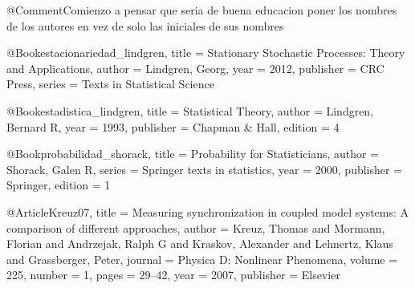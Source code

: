 @Comment{Comienzo a pensar que seria de buena educacion poner los nombres de los autores en vez
         de solo las iniciales de sus nombres}
%
%
%
%
%

%


@Book{estacionariedad_lindgren,
    title     = {{Stationary Stochastic Processes: Theory and Applications}},
    author    = {Lindgren, Georg},
    year      = {2012},
    publisher = {CRC Press},
    series    = {{Texts in Statistical Science}}
}

@Book{estadistica_lindgren,
    title     = {Statistical Theory},
    author    = {Lindgren, Bernard R},
    year      = {1993},
    publisher = {Chapman \& Hall},
    edition   = {4}
}

@Book{probabilidad_shorack,
    title     = {{Probability for Statisticians}},
    author    = {Shorack, Galen R},
    series    = {Springer texts in statistics},
    year      = {2000},
    publisher = {Springer},
    edition   = {1}
}

@Article{Kreuz07,
    title   = {Measuring synchronization in coupled model systems: {A} comparison of different 
    		   approaches},
    author  = {Kreuz, Thomas 
    		   and Mormann, Florian 
    		   and Andrzejak, Ralph G 
    		   and Kraskov, Alexander 
    		   and Lehnertz, Klaus 
    		   and Grassberger, Peter},
    journal = {{Physica D: Nonlinear Phenomena}},
    volume  = {225},
    number  = {1},
    pages   = {29--42},
    year    = {2007},
    publisher = {Elsevier}
}

